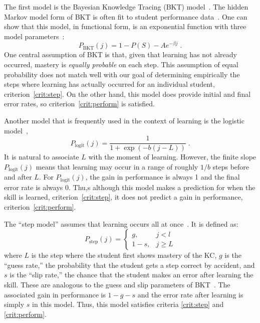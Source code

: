 \documentclass{acmlarge-edm}
\begin{document}
The first model is the Bayesian Knowledge Tracing (BKT) 
model~\cite{corbett_knowledge_1994}.  The hidden Markov model
form of BKT is often fit to student performance 
data~\cite{beck_identifiability:_2007}.  One can show that
this model, in functional form, is an exponential function
with three model parameters~\cite{van_de_sande_bayesian_2012}:
%
\begin{equation}
         P_\mathrm{BKT}(j) = 1-P(S) -A e^{-\beta j} \; .
\end{equation}
%
One central assumption of BKT is that, given that learning
has not already occurred, mastery is {\em equally probable} on each step.
This assumption of equal probability does not match well with 
our goal of determining empirically the steps where learning has 
actually occurred for an individual student, criterion~\ref{crit:step}.
On the other hand, this model does provide initial and final
error rates, so criterion~\ref{crit:perform} is satisfied. 

Another model that is frequently used in the context of 
learning is the logistic model~\cite{cen_learning_2006,min_chi_instructional_2011},
%
\begin{equation}
    P_\mathrm{logit}(j)= \frac{1}{1+\exp\left(-b (j-L)\right)} \; .
\end{equation}
%
It is natural to associate $L$ with the moment of learning.  However,
the finite slope $P_\mathrm{logit}(j)$ means that learning may occur
in a range of roughly $1/b$ steps before and after $L$.    For  
$P_\mathrm{logit}(j)$, the gain in performance is always 1 and the final error
rate is always 0.  Thu,s although this model makes a prediction for
when the skill is learned, criterion~\ref{crit:step}, it does
not predict a gain in performance, criterion~\ref{crit:perform}.

The ``step model'' assumes that learning occurs all at 
once~\cite{baker_detecting_2011}.  It is defined as:
%
\begin{equation}
    P_\mathrm{step}(j)= \left\{\begin{array}{cc}
                 g, & j<l \\
                 1-s, & j\ge L 
                 \end{array} \right. 
\end{equation}
%
where $L$ is the step where the student first shows mastery of the
KC, $g$ is the ``guess rate,'' the probability that the student
gets a step correct by accident, and $s$ is the ``slip rate,''
the chance that the student makes an error after learning
the skill.  These are analogous to the guess and slip parameters 
of BKT~\cite{corbett_knowledge_1994}.  
The associated gain in performance
is $1-g-s$ and the error rate after learning is simply $s$ in this
model.  Thus, this model satisfies criteria \ref{crit:step} and
\ref{crit:perform}.
\end{document}
